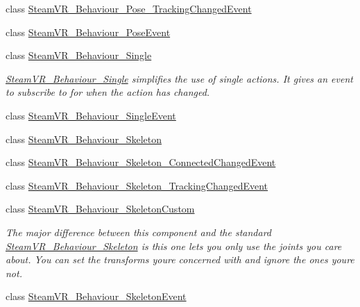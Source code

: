 \begin{DoxyCompactItemize}
\item 
class \mbox{\hyperlink{class_valve_1_1_v_r_1_1_steam_v_r___behaviour___pose___tracking_changed_event}{Steam\+V\+R\+\_\+\+Behaviour\+\_\+\+Pose\+\_\+\+Tracking\+Changed\+Event}}
\item 
class \mbox{\hyperlink{class_valve_1_1_v_r_1_1_steam_v_r___behaviour___pose_event}{Steam\+V\+R\+\_\+\+Behaviour\+\_\+\+Pose\+Event}}
\item 
class \mbox{\hyperlink{class_valve_1_1_v_r_1_1_steam_v_r___behaviour___single}{Steam\+V\+R\+\_\+\+Behaviour\+\_\+\+Single}}
\begin{DoxyCompactList}\small\item\em \mbox{\hyperlink{class_valve_1_1_v_r_1_1_steam_v_r___behaviour___single}{Steam\+V\+R\+\_\+\+Behaviour\+\_\+\+Single}} simplifies the use of single actions. It gives an event to subscribe to for when the action has changed. \end{DoxyCompactList}\item 
class \mbox{\hyperlink{class_valve_1_1_v_r_1_1_steam_v_r___behaviour___single_event}{Steam\+V\+R\+\_\+\+Behaviour\+\_\+\+Single\+Event}}
\item 
class \mbox{\hyperlink{class_valve_1_1_v_r_1_1_steam_v_r___behaviour___skeleton}{Steam\+V\+R\+\_\+\+Behaviour\+\_\+\+Skeleton}}
\item 
class \mbox{\hyperlink{class_valve_1_1_v_r_1_1_steam_v_r___behaviour___skeleton___connected_changed_event}{Steam\+V\+R\+\_\+\+Behaviour\+\_\+\+Skeleton\+\_\+\+Connected\+Changed\+Event}}
\item 
class \mbox{\hyperlink{class_valve_1_1_v_r_1_1_steam_v_r___behaviour___skeleton___tracking_changed_event}{Steam\+V\+R\+\_\+\+Behaviour\+\_\+\+Skeleton\+\_\+\+Tracking\+Changed\+Event}}
\item 
class \mbox{\hyperlink{class_valve_1_1_v_r_1_1_steam_v_r___behaviour___skeleton_custom}{Steam\+V\+R\+\_\+\+Behaviour\+\_\+\+Skeleton\+Custom}}
\begin{DoxyCompactList}\small\item\em The major difference between this component and the standard \mbox{\hyperlink{class_valve_1_1_v_r_1_1_steam_v_r___behaviour___skeleton}{Steam\+V\+R\+\_\+\+Behaviour\+\_\+\+Skeleton}} is this one lets you only use the joints you care about. You can set the transforms you\textquotesingle{}re concerned with and ignore the ones you\textquotesingle{}re not. \end{DoxyCompactList}\item 
class \mbox{\hyperlink{class_valve_1_1_v_r_1_1_steam_v_r___behaviour___skeleton_event}{Steam\+V\+R\+\_\+\+Behaviour\+\_\+\+Skeleton\+Event}}

\end{DoxyCompactItemize}
